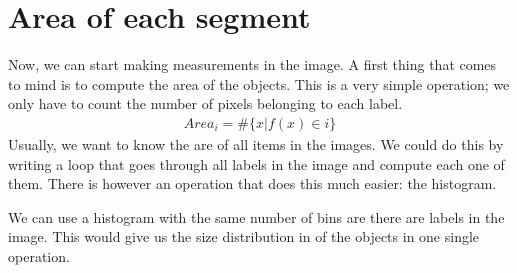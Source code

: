 \documentclass[letterpaper,10pt,english]{sphinxmanual}
\begin{document}
\begin{sphinxVerbatim}[commandchars=\\\{\}]
       
 
  
 
\end{sphinxVerbatim}

\noindent{}


\section{Area of each segment}
\label{\detokenize{06-ShapeAnalysis:area-of-each-segment}}
\sphinxAtStartPar
Now, we can start making measurements in the image. A first thing that comes to mind is to compute the area of the objects. This is a very simple operation; we only have to count the number of pixels belonging to each label.
\begin{equation*}
\begin{split}Area_i=\#\{x|f(x)\in{}i\}\end{split}
\end{equation*}
\sphinxAtStartPar
Usually, we want to know the are of all items in the images. We could do this by writing a loop that goes through all labels in the image and compute each one of them. There is however an operation that does this much easier: the histogram.

\sphinxAtStartPar
We can use a histogram with the same number of bins are there are labels in the image. This would give us the size distribution in of the objects in one single operation.
\end{document}
